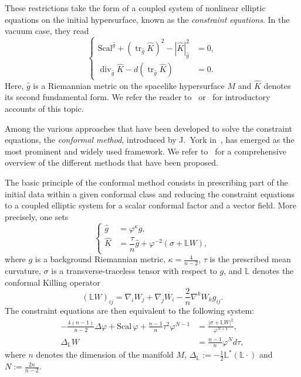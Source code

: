 \documentclass[a4paper, 10pt, reqno]{amsart}
\theoremstyle{plain}
\theoremstyle{remark}
\theoremstyle{definition}
\renewcommand{\phi}{\varphi}
\newcommand{\bL}{\mathbb{L}}
\newcommand{\ghat}{{\widehat{g}}}
\newcommand{\Khat}{\widehat{K}}
\DeclareMathOperator{\tr}{tr}
\DeclareMathOperator{\divg}{div}
\newcommand{\scal}{\mathrm{Scal}}
\begin{document}
These restrictions take the form of a coupled system of nonlinear elliptic
equations on the initial hypersurface, known as the \emph{constraint
    equations}. In the vacuum case, they read
\[
    \begin{cases}
        \scal^{\ghat} + \left(\tr_{\ghat} \Khat\right)^2 - \left|\Khat\right|_{\ghat}^2 & = 0, \\
        \divg_{\ghat} \Khat - d \left(\tr_{\ghat} \Khat\right)                          & = 0.
    \end{cases}
\]
Here, $\ghat$ is a Riemannian metric on the spacelike hypersurface $M$ and
$\Khat$ denotes its second fundamental form. We refer the reader
to~\cite{BartnikIsenberg} or~\cite{ChoquetBruhat} for introductory accounts of
this topic.

Among the various approaches that have been developed to solve the constraint
equations, the \emph{conformal method}, introduced by J.~York
in~\cite{YorkDecomposition}, has emerged as the most prominent and widely used
framework. We refer to~\cite{CarlottoReview} for a comprehensive overview of
the different methods that have been proposed.

The basic principle of the conformal method consists in prescribing part of the
initial data within a given conformal class and reducing the constraint
equations to a coupled elliptic system for a scalar conformal factor and a
vector field. More precisely, one sets
\[
    \begin{cases}
        \ghat & = \phi^\kappa g,                                      \\
        \Khat & = \dfrac{\tau}{n} \ghat + \phi^{-2} (\sigma + \bL W),
    \end{cases}
\]
where $g$ is a background Riemannian metric, $\kappa = \frac{4}{n-2}$, $\tau$
is the prescribed mean curvature, $\sigma$ is a transverse-traceless tensor
with respect to $g$, and $\bL$ denotes the conformal Killing operator
\[
    (\bL W)_{ij} = \nabla_i W_j + \nabla_j W_i - \frac{2}{n} \nabla^k W_k g_{ij}.
\]
The constraint equations are then equivalent to the following system:
\begin{subequations}\label{eqConstraints}
    \begin{align}
        - \frac{4(n-1)}{n-2} \Delta \phi + \scal\,\phi + \frac{n-1}{n} \tau^2 \phi^{N-1}
         & = \frac{|\sigma + \bL W|^2}{\phi^{N+1}}, \label{eqLichnerowicz} \\
        \Delta_{\bL} W
         & = \frac{n-1}{n} \phi^N d\tau, \label{eqVector}
    \end{align}
\end{subequations}
where $n$ denotes the dimension of the manifold $M$, $\Delta_{\mathbb L} :=
    -\frac 12\mathbb L^{\ast}(\mathbb L \cdot)$ and $N := \frac{2n}{n-2}$.
\end{document}
